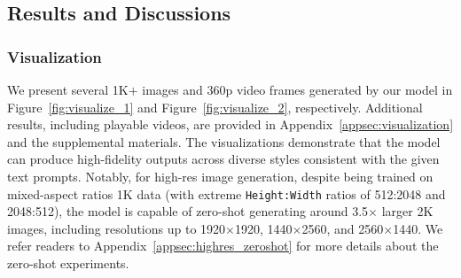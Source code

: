 \subsection{Results and Discussions}

\subsubsection{Visualization} We present several 1K$+$ images and 360p video frames generated by our \ours{} model in Figure~\ref{fig:visualize_1} and Figure~\ref{fig:visualize_2}, respectively. Additional results, including playable videos, are provided in Appendix~\ref{appsec:visualization} and the supplemental materials. The visualizations demonstrate that the model can produce high-fidelity outputs across diverse styles consistent with the given text prompts. Notably, for high-res image generation, despite being trained on mixed-aspect ratios 1K data (with extreme \texttt{Height:Width} ratios of 512:2048 and 2048:512), the model is capable of zero-shot generating around 3.5$\times$ larger 2K images, including resolutions up to 1920$\times$1920, 1440$\times$2560, and 2560$\times$1440. We refer readers to Appendix~\ref{appsec:highres_zeroshot} for more details about the zero-shot experiments.


\begin{table}[t]
  \caption{Comparison of 256$\times$256 T2I generation.}
  \vspace{3pt}
  \begin{center}
  \end{center}
  \label{tab:eval_256p}
  \vspace{-15pt}
\end{table}


